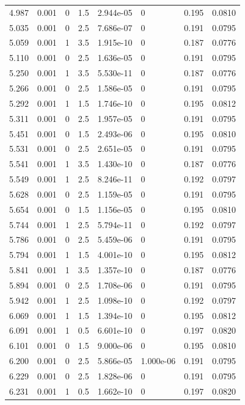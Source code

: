 \documentclass[preview]{standalone}
\begin{document}
{{{\begin{tabular}{L{1.2cm}C{1.2cm} C{0.3cm}C{0.5cm} C{1.4cm}C{1.4cm} C{1.4cm}C{1.4cm}}
  4.987  &  0.001  & 0     & 1.5 &  2.944e-05  & 0  & 0.195 &  0.0810   \\ 
  5.035  &  0.001  & 0     & 2.5 &  7.686e-07  & 0  & 0.191 &  0.0795   \\ 
  5.059  &  0.001  & 1     & 3.5 &  1.915e-10  & 0  & 0.187 &  0.0776   \\ 
  5.110  &  0.001  & 0     & 2.5 &  1.636e-05  & 0  & 0.191 &  0.0795   \\ 
  5.250  &  0.001  & 1     & 3.5 &  5.530e-11  & 0  & 0.187 &  0.0776   \\ 
  5.266  &  0.001  & 0     & 2.5 &  1.586e-05  & 0  & 0.191 &  0.0795   \\ 
  5.292  &  0.001  & 1     & 1.5 &  1.746e-10  & 0  & 0.195 &  0.0812   \\ 
  5.311  &  0.001  & 0     & 2.5 &  1.957e-05  & 0  & 0.191 &  0.0795   \\ 
  5.451  &  0.001  & 0     & 1.5 &  2.493e-06  & 0  & 0.195 &  0.0810   \\ 
  5.531  &  0.001  & 0     & 2.5 &  2.651e-05  & 0  & 0.191 &  0.0795   \\ 
  5.541  &  0.001  & 1     & 3.5 &  1.430e-10  & 0  & 0.187 &  0.0776   \\ 
  5.549  &  0.001  & 1     & 2.5 &  8.246e-11  & 0  & 0.192 &  0.0797   \\ 
  5.628  &  0.001  & 0     & 2.5 &  1.159e-05  & 0  & 0.191 &  0.0795   \\ 
  5.654  &  0.001  & 0     & 1.5 &  1.156e-05  & 0  & 0.195 &  0.0810   \\ 
  5.744  &  0.001  & 1     & 2.5 &  5.794e-11  & 0  & 0.192 &  0.0797   \\ 
  5.786  &  0.001  & 0     & 2.5 &  5.459e-06  & 0  & 0.191 &  0.0795   \\ 
  5.794  &  0.001  & 1     & 1.5 &  4.001e-10  & 0  & 0.195 &  0.0812   \\ 
  5.841  &  0.001  & 1     & 3.5 &  1.357e-10  & 0  & 0.187 &  0.0776   \\ 
  5.894  &  0.001  & 0     & 2.5 &  1.708e-06  & 0  & 0.191 &  0.0795   \\ 
  5.942  &  0.001  & 1     & 2.5 &  1.098e-10  & 0  & 0.192 &  0.0797   \\ 
  6.069  &  0.001  & 1     & 1.5 &  1.394e-10  & 0  & 0.195 &  0.0812   \\ 
  6.091  &  0.001  & 1     & 0.5 &  6.601e-10  & 0  & 0.197 &  0.0820   \\ 
  6.101  &  0.001  & 0     & 1.5 &  9.000e-06  & 0  & 0.195 &  0.0810   \\ 
  6.200  &  0.001  & 0     & 2.5 &  5.866e-05  & 1.000e-06  & 0.191 &  0.0795   \\ 
  6.229  &  0.001  & 0     & 2.5 &  1.828e-06  & 0  & 0.191 &  0.0795   \\ 
  6.231  &  0.001  & 1     & 0.5 &  1.662e-10  & 0  & 0.197 &  0.0820   \\ 
\hline 
\end{tabular} 

}}}
\end{document}
